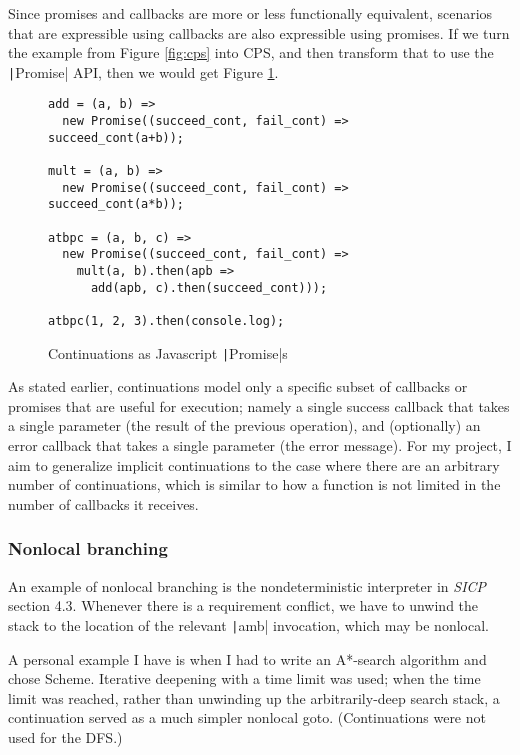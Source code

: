 \documentclass[]{article}
\begin{document}
Since promises and callbacks are more or less functionally equivalent, scenarios that are expressible using callbacks are also expressible using promises. If we turn the example from Figure \ref{fig:cps} into CPS, and then transform that to use the \texttt|Promise| API, then we would get Figure \ref{fig:prom}.

\begin{figure}[]
  \centering
\begin{verbatim}
add = (a, b) =>
  new Promise((succeed_cont, fail_cont) => succeed_cont(a+b));

mult = (a, b) =>
  new Promise((succeed_cont, fail_cont) => succeed_cont(a*b));

atbpc = (a, b, c) =>
  new Promise((succeed_cont, fail_cont) =>
    mult(a, b).then(apb =>
      add(apb, c).then(succeed_cont)));

atbpc(1, 2, 3).then(console.log);
\end{verbatim}
  \caption{Continuations as Javascript \texttt|Promise|s}
  \label{fig:prom}
\end{figure}

As stated earlier, continuations model only a specific subset of callbacks or promises that are useful for execution; namely a single success callback that takes a single parameter (the result of the previous operation), and (optionally) an error callback that takes a single parameter (the error message). For my project, I aim to generalize implicit continuations to the case where there are an arbitrary number of continuations, which is similar to how a function is not limited in the number of callbacks it receives.

\subsubsection{Nonlocal branching}
\label{sec:nonl}

An example of nonlocal branching is the nondeterministic interpreter in \textit{SICP} section 4.3. Whenever there is a requirement conflict, we have to unwind the stack to the location of the relevant \texttt|amb| invocation, which may be nonlocal.

A personal example I have is when I had to write an A*-search algorithm and chose Scheme. Iterative deepening with a time limit was used; when the time limit was reached, rather than unwinding up the arbitrarily-deep search stack, a continuation served as a much simpler nonlocal goto. (Continuations were not used for the DFS.)
\end{document}

